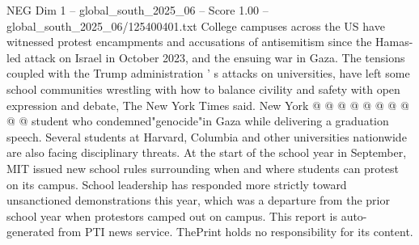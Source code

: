 \begin{textsample}{NEG Dim 1 – global\_south\_2025\_06 – Score 1.00 – global\_south\_2025\_06/125400401.txt}
College campuses across the US have witnessed protest encampments and accusations of antisemitism since the Hamas-led attack on Israel in October 2023, and the ensuing war in Gaza.
The tensions coupled with the Trump administration ' s attacks on universities, have left some school communities wrestling with how to balance civility and safety with open expression and debate, The New York Times said.
New York @ @ @ @ @ @ @ @ @ @ student who condemned"genocide"in Gaza while delivering a graduation speech.
Several students at Harvard, Columbia and other universities nationwide are also facing disciplinary threats.
At the start of the school year in September, MIT issued new school rules surrounding when and where students can protest on its campus.
School leadership has responded more strictly toward unsanctioned demonstrations this year, which was a departure from the prior school year when protestors camped out on campus.
This report is auto-generated from PTI news service.
ThePrint holds no responsibility for its content.

\end{textsample}

